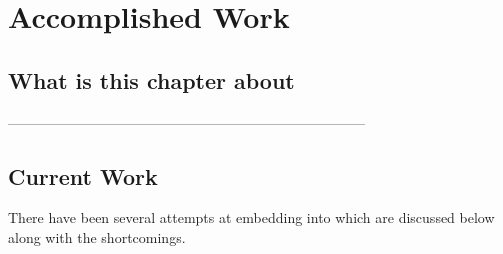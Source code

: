 \documentclass[thesis-solanki.tex]{subfiles}
\begin{document}
\chapter{Accomplished Work}\label{chap:proposedWork}

\section{What is this chapter about}

-----------------------------------------------------------------------------


\section{Current Work}

There have been several attempts at embedding  into  which are discussed below along with the
shortcomings.
\end{document}
